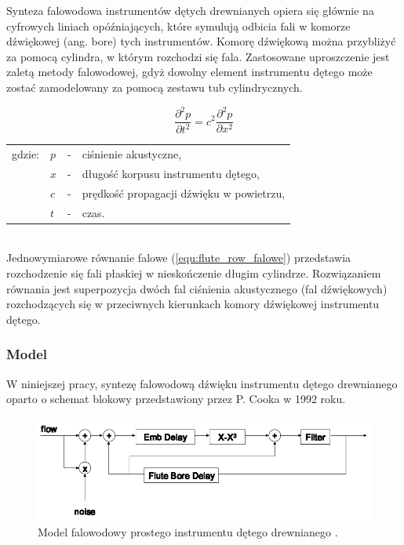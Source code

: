 Synteza falowodowa instrumentów dętych drewnianych opiera się głównie na cyfrowych liniach opóźniających, które symulują odbicia fali w komorze dźwiękowej (ang. bore) tych instrumentów. Komorę dźwiękową można przybliżyć za pomocą cylindra, w którym rozchodzi się fala. Zastosowane uproszczenie jest zaletą metody falowodowej, gdyż dowolny element instrumentu dętego może zostać zamodelowany za pomocą zestawu tub cylindrycznych.

\begin{equation} \label{equ:flute_row_falowe}
\frac{\partial^2 p}{\partial t^2} = c^{2}\frac{\partial^2 p}{\partial x^2}
\end{equation}
\begin{tabular}{ l l l l}
	gdzie: 	&	$p$ & - &  ciśnienie akustyczne, \\
	&	$x$ & - &  długość korpusu instrumentu dętego,\\
	&	$c$ & - &  prędkość propagacji dźwięku w powietrzu,\\
	&	$t$ & - &  czas. \\
\end{tabular} \\

Jednowymiarowe równanie falowe (\ref{equ:flute_row_falowe}) przedstawia rozchodzenie się fali płaskiej w nieskończenie długim cylindrze. Rozwiązaniem równania jest superpozycja dwóch fal ciśnienia akustycznego (fal dźwiękowych) rozchodzących się w przeciwnych kierunkach komory dźwiękowej instrumentu dętego.


\subsubsection{Model}
W niniejszej pracy, syntezę falowodową dźwięku instrumentu dętego drewnianego oparto o schemat blokowy przedstawiony przez P. Cooka w 1992 roku.

\begin{figure}[H]
	\centering
	\includegraphics[width=14cm]{grafiki/flute_waveguide_mod}
	\captionsetup{justification=centering}
	\caption{Model falowodowy prostego instrumentu dętego drewnianego \cite{flute_prezka}.}
	\label{rys:flute_cook}
\end{figure}

